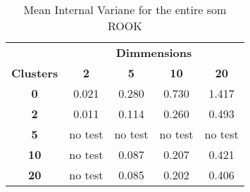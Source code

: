 \begin{table}
\caption{Mean Internal Variane for the entire som ROOK}
\label{ivtable2}
\begin{tabular}{|c||c|c|c|c|}
\hline
&\multicolumn{4}{c|}{\textbf{Dimmensions}}\\
\textbf{Clusters} & \multicolumn{1}{c}{\textbf{2}} &
\multicolumn{1}{c}{\textbf{5}} & \multicolumn{1}{c}{\textbf{10}} &
\multicolumn{1}{c|}{\textbf{20}}\\
\hline
\hline
\textbf{0} & 0.021& 0.280& 0.730& 1.417 \\
\hline
\textbf{2} & 0.011& 0.114& 0.260& 0.493 \\
\hline
\textbf{5} & no test& no test& no test& no test \\
\hline
\textbf{10} & no test& 0.087& 0.207& 0.421 \\
\hline
\textbf{20} & no test& 0.085& 0.202& 0.406 \\
\hline
\end{tabular} \end{table}
